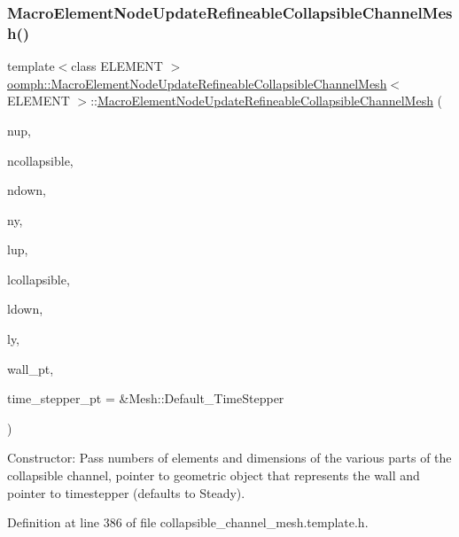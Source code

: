 \subsubsection{\texorpdfstring{Macro\+Element\+Node\+Update\+Refineable\+Collapsible\+Channel\+Mesh()}{MacroElementNodeUpdateRefineableCollapsibleChannelMesh()}}
{\footnotesize\ttfamily template$<$class E\+L\+E\+M\+E\+NT $>$ \\
\hyperlink{classoomph_1_1MacroElementNodeUpdateRefineableCollapsibleChannelMesh}{oomph\+::\+Macro\+Element\+Node\+Update\+Refineable\+Collapsible\+Channel\+Mesh}$<$ E\+L\+E\+M\+E\+NT $>$\+::\hyperlink{classoomph_1_1MacroElementNodeUpdateRefineableCollapsibleChannelMesh}{Macro\+Element\+Node\+Update\+Refineable\+Collapsible\+Channel\+Mesh} (\begin{DoxyParamCaption}\item[{const unsigned \&}]{nup,  }\item[{const unsigned \&}]{ncollapsible,  }\item[{const unsigned \&}]{ndown,  }\item[{const unsigned \&}]{ny,  }\item[{const double \&}]{lup,  }\item[{const double \&}]{lcollapsible,  }\item[{const double \&}]{ldown,  }\item[{const double \&}]{ly,  }\item[{Geom\+Object $\ast$}]{wall\+\_\+pt,  }\item[{Time\+Stepper $\ast$}]{time\+\_\+stepper\+\_\+pt = {\ttfamily \&Mesh\+:\+:Default\+\_\+TimeStepper} }\end{DoxyParamCaption})\hspace{0.3cm}{\ttfamily [inline]}}



Constructor\+: Pass numbers of elements and dimensions of the various parts of the collapsible channel, pointer to geometric object that represents the wall and pointer to timestepper (defaults to Steady). 



Definition at line 386 of file collapsible\+\_\+channel\+\_\+mesh.\+template.\+h.

\mbox{\label{classoomph_1_1MacroElementNodeUpdateRefineableCollapsibleChannelMesh_a5f0960e124d26e10cc70e2143744a07f}} 
